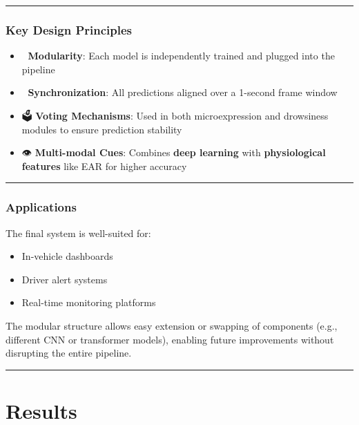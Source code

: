 \documentclass[
  letterpaper,
  DIV=11,
  numbers=noendperiod]{scrreport}
\providecommand{\tightlist}{%
  \setlength{\itemsep}{0pt}\setlength{\parskip}{0pt}}
\begin{document}
\begin{center}\rule{0.5\linewidth}{0.5pt}\end{center}

\subsection{Key Design Principles}\label{key-design-principles}

\begin{itemize}
\tightlist
\item
  🧠 \textbf{Modularity}: Each model is independently trained and
  plugged into the pipeline
\item
  🔁 \textbf{Synchronization}: All predictions aligned over a 1-second
  frame window
\item
  🗳️ \textbf{Voting Mechanisms}: Used in both microexpression and
  drowsiness modules to ensure prediction stability
\item
  👁️ \textbf{Multi-modal Cues}: Combines \textbf{deep learning} with
  \textbf{physiological features} like EAR for higher accuracy
\end{itemize}

\begin{center}\rule{0.5\linewidth}{0.5pt}\end{center}

\subsection{Applications}\label{applications}

The final system is well-suited for:

\begin{itemize}
\tightlist
\item
  In-vehicle dashboards
\item
  Driver alert systems
\item
  Real-time monitoring platforms
\end{itemize}

The modular structure allows easy extension or swapping of components
(e.g., different CNN or transformer models), enabling future
improvements without disrupting the entire pipeline.

\begin{center}\rule{0.5\linewidth}{0.5pt}\end{center}


\chapter{Results}\label{results}
\end{document}

